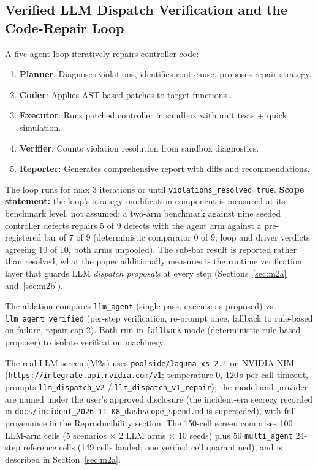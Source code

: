 \documentclass[11pt,a4paper]{article}
\newcommand{\agent}[1]{\texttt{#1}}
\begin{document}
\subsection{Verified LLM Dispatch Verification and the Code-Repair Loop}
\label{sec:repairloop}
A five-agent loop iteratively repairs controller code:
\begin{enumerate}
    \item \textbf{Planner}: Diagnoses violations, identifies root cause, proposes repair strategy.
    \item \textbf{Coder}: Applies AST-based patches to target functions \cite{ast2020}.
    \item \textbf{Executor}: Runs patched controller in sandbox with unit tests + quick simulation.
    \item \textbf{Verifier}: Counts violation resolution from sandbox diagnostics.
    \item \textbf{Reporter}: Generates comprehensive report with diffs and recommendations.
\end{enumerate}
The loop runs for max 3 iterations or until \texttt{violations\_resolved=true}.
\textbf{Scope statement:} the loop's strategy-modification component is
measured at its benchmark level, not assumed: a two-arm benchmark against
nine seeded controller defects repairs 5 of 9 defects with the agent arm
against a pre-registered bar of 7 of 9 (deterministic comparator 0 of 9;
loop and driver verdicts agreeing 10 of 10, both arms unpooled). The
sub-bar result is reported rather than resolved; what the paper additionally
measures is the runtime verification layer that guards LLM \emph{dispatch
proposals} at every step (Sections~\ref{sec:m2a} and~\ref{sec:m2b}).

The ablation compares \agent{llm\_agent} (single-pass, execute-as-proposed) vs.
\agent{llm\_agent\_verified} (per-step verification, re-prompt once, fallback
to rule-based on failure, repair cap 2). Both run in \texttt{fallback} mode
(deterministic rule-based proposer) to isolate verification machinery.

The real-LLM screen (M2a) uses \texttt{poolside/laguna-xs-2.1} on NVIDIA
NIM (\texttt{https://integrate.api.nvidia.com/v1}; temperature 0, 120\,s
per-call timeout, prompts \texttt{llm\_dispatch\_v2} /
\texttt{llm\_dispatch\_v1\_repair}); the model and provider are named under
the user's approved disclosure (the incident-era secrecy recorded in
\texttt{docs/incident\_2026-11-08\_dashscope\_spend.md} is superseded), with
full provenance in
the Reproducibility section. The 150-cell screen comprises 100 LLM-arm cells
(5 scenarios $\times$ 2 LLM arms $\times$ 10 seeds) plus 50 \agent{multi\_agent}
24-step reference cells (149 cells landed; one verified cell quarantined), and
is described in Section~\ref{sec:m2a}.
\end{document}
